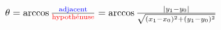 \documentclass[tikz,convert={outfile=\jobname.svg}]{standalone}
\begin{document}
$\theta = \arccos \frac{\text{\color{blue}{adjacent}}}{\text{\color{red}{hypothénuse}}} = \arccos \frac{| y_1-y_0|}{\sqrt{(x_1-x_0)^2 + (y_1-y_0)^2} }$
\end{document}

